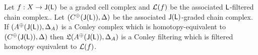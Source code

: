 \begin{thm}
Let $f:X\to {\mathsf J}({\mathsf L})$ be a graded cell complex and ${\mathcal L}(f)$ be the associated ${\mathsf L}$-filtered chain complex..  Let $(C^\oplus({\mathsf J}({\mathsf L})),\Delta)$ be the associated ${\mathsf J}({\mathsf L})$-graded chain complex.  If $(A^\oplus({\mathsf J}({\mathsf L})),\Delta_A)$ is a Conley complex which is homotopy-equivalent to $(C^\oplus({\mathsf J}({\mathsf L})),\Delta)$ then $\mathfrak{L}(A^\oplus({\mathsf J}({\mathsf L})),\Delta_A)$ is a Conley filtering which is filtered homotopy equivalent to ${\mathcal L}(f)$.
\end{thm}












